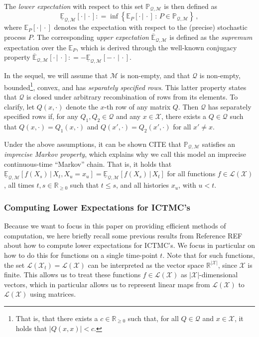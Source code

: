 \documentclass[twoside,11pt]{article}
\newcommand{\reals}{\mathbb{R}}
\newcommand{\realsnonneg}{\reals_{\geq 0}}
\newcommand{\states}{\mathcal{X}}
\newcommand{\lexp}{\underline{\mathbb{E}}_{\rateset,\mathcal{M}}}
\newcommand{\uexp}{\overline{\mathbb{E}}_{\rateset,\mathcal{M}}}
\newcommand{\gambles}{\mathcal{L}}
\newcommand{\gamblesX}{\gambles(\states)}
\newcommand{\rateset}{\mathcal{Q}}
\newcommand{\abs}[1]{\left\vert #1 \right\vert}
\newcommand{\coloneqq}{:\!=}
\begin{document}
The \emph{lower expectation} with respect to this set $\mathbb{P}_{\rateset,\mathcal{M}}$ is then defined as
\begin{equation*}
\underline{\mathbb{E}}_{\rateset,\mathcal{M}}[\cdot\,\vert\,\cdot] \coloneqq \inf\left\{ \mathbb{E}_P[\cdot\,\vert\,\cdot]\,:\, P\in\mathbb{P}_{\rateset,\mathcal{M}} \right\}\,,
\end{equation*}
where $\mathbb{E}_P[\cdot\,\vert\,\cdot]$ denotes the expectation with respect to the (precise) stochastic process $P$. The corresponding \emph{upper expectation} $\uexp$ is defined as the \emph{supremum} expectation over the $\mathbb{E}_P$, which is derived through the well-known conjugacy property $\uexp[\cdot\,\vert\,\cdot]\coloneqq -\lexp[-\cdot\,\vert\,\cdot]$.

In the sequel, we will assume that $\mathcal{M}$ is non-empty, and that $\rateset$ is non-empty, bounded\footnote{That is, that there exists a $c\in\realsnonneg$ such that, for all $Q\in\rateset$ and $x\in\states$, it holds that $\abs{Q(x,x)}<c$.}, convex, and has \emph{separately specified rows}. This latter property states that $\rateset$ is closed under arbitrary recombination of rows from its elements. To clarify, let $Q(x,\cdot)$ denote the $x$-th row of any matrix $Q$. Then $\rateset$ has separately specified rows if, for any $Q_1,Q_2\in\rateset$ and any $x\in\states$, there exists a $Q\in\rateset$ such that $Q(x,\cdot)= Q_1(x,\cdot)$ and $Q(x',\cdot)= Q_2(x',\cdot)$ for all $x'\neq x$.

Under the above assumptions, it can be shown CITE that $\mathbb{P}_{\rateset,\mathcal{M}}$ satisfies an \emph{imprecise Markov property}, which explains why we call this model an imprecise continuous-time ``Markov'' chain. That is, it holds that $\lexp[f(X_s)\,\vert\,X_t,X_u=x_u]=\lexp[f(X_s)\,\vert\,X_t]$ for all functions $f\in\gamblesX$, all times $t,s\in\realsnonneg$ such that $t\leq s$, and all histories $x_u$, with $u<t$.

\subsubsection{Computing Lower Expectations for ICTMC's}\label{subsec:ICTMC_computations}

Because we want to focus in this paper on providing efficient methods of computation, we here briefly recall some previous results from Reference REF about how to compute lower expectations for ICTMC's. We focus in particular on how to do this for functions on a single time-point $t$. Note that for such functions, the set $\gambles(\states_t)=\gamblesX$ can be interpreted as the vector space $\reals^{\lvert\states\rvert}$, since $\states$ is finite. This allows us to treat these functions $f\in\gamblesX$ as $\lvert\states\rvert$-dimensional vectors, which in particular allows us to represent linear maps from $\gamblesX$ to $\gamblesX$ using matrices.
\end{document}

